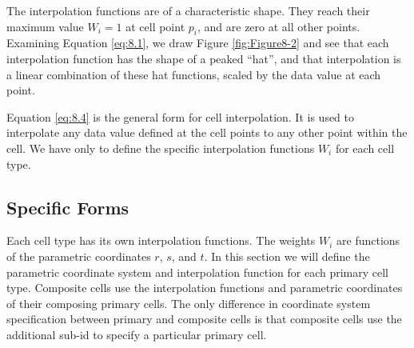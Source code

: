 The interpolation functions are of a characteristic shape. They reach their maximum value $W_i = 1$ at cell point $p_i$, and are zero at all other points. Examining Equation \ref{eq:8.1}, we draw Figure \ref{fig:Figure8-2} and see that each interpolation function has the shape of a peaked ``hat'', and that interpolation is a linear combination of these hat functions, scaled by the data value at each point.

Equation \ref{eq:8.4} is the general form for cell interpolation. It is used to interpolate any data value defined at the cell points to any other point within the cell. We have only to define the specific interpolation functions $W_i$ for each cell type.

\subsection{Specific Forms}

Each cell type has its own interpolation functions. The weights $W_i$ are functions of the parametric coordinates $r$, $s$, and $t$. In this section we will define the parametric coordinate system and interpolation function for each primary cell type. Composite cells use the interpolation functions and parametric coordinates of their composing primary cells. The only difference in coordinate system specification between primary and composite cells is that composite cells use the additional sub-id to specify a particular primary cell.

